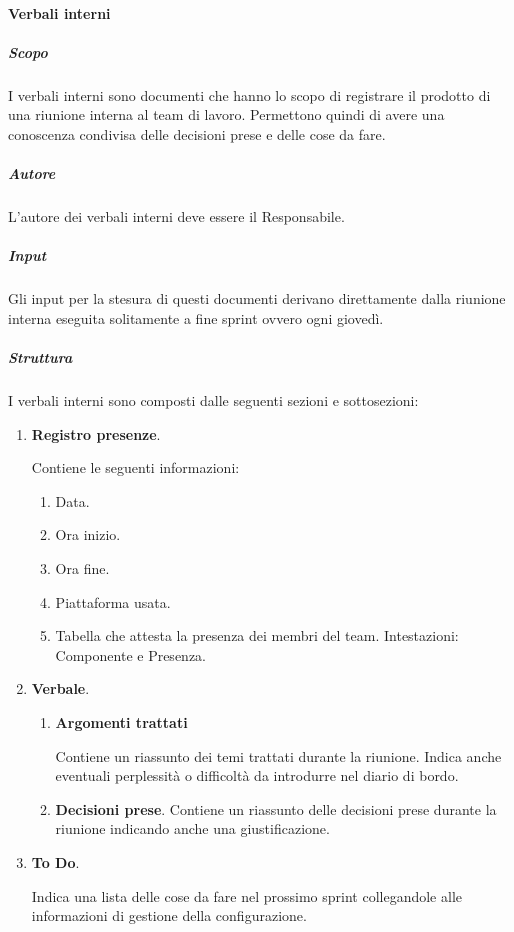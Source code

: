 \paragraph{Verbali interni}

\subparagraph{Scopo}
I verbali interni sono documenti che hanno lo scopo di registrare il prodotto di una riunione interna al team di lavoro.
Permettono quindi di avere una conoscenza condivisa delle decisioni prese e delle cose da fare.

\subparagraph{Autore}
L'autore dei verbali interni deve essere il Responsabile.

\subparagraph{Input}
Gli input per la stesura di questi documenti derivano direttamente dalla riunione interna eseguita solitamente a fine sprint ovvero ogni giovedì.

\subparagraph{Struttura}
I verbali interni sono composti dalle seguenti sezioni e sottosezioni:
\begin{enumerate}
    \item \textbf{Registro presenze}.
    
    Contiene le seguenti informazioni:
    \begin{enumerate}
        \item Data.
        \item Ora inizio.
        \item Ora fine.
        \item Piattaforma usata.
        \item Tabella che attesta la presenza dei membri del team.
        Intestazioni: Componente e Presenza.
    \end{enumerate}
    \item \textbf{Verbale}.
    \begin{enumerate}
        \item \textbf{Argomenti trattati}
        
        Contiene un riassunto dei temi trattati durante la riunione.
        Indica anche eventuali perplessità o difficoltà da introdurre nel diario di bordo.
        \item \textbf{Decisioni prese}.
        Contiene un riassunto delle decisioni prese durante la riunione indicando anche una giustificazione.
    \end{enumerate}

    \item \textbf{To Do}.
    
    Indica una lista delle cose da fare nel prossimo sprint collegandole alle informazioni di gestione della configurazione.
\end{enumerate}

